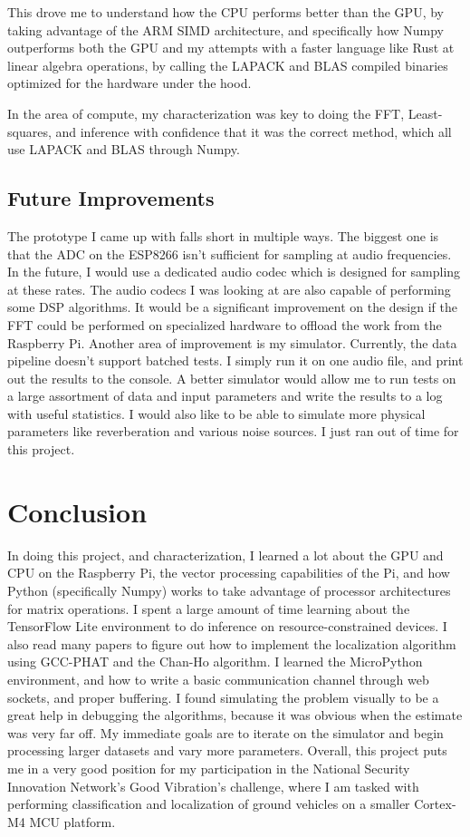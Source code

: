 \documentclass[12pt]{article}
\begin{document}
This drove me to understand how the CPU performs better than the GPU, by taking advantage of the ARM SIMD architecture, and specifically how Numpy outperforms both the GPU and my attempts with a faster language like Rust at linear algebra operations, by calling the LAPACK and BLAS compiled binaries optimized for the hardware under the hood.

In the area of compute, my characterization was key to doing the FFT, Least-squares, and inference with confidence that it was the correct method, which all use LAPACK and BLAS through Numpy.

\subsection{Future Improvements}
	The prototype I came up with falls short in multiple ways. The biggest one is that the ADC on the ESP8266 isn't sufficient for sampling at audio frequencies. In the future, I would use a dedicated audio codec which is designed for sampling at these rates. The audio codecs I was looking at are also capable of performing some DSP algorithms. It would be a significant improvement on the design if the FFT could be performed on specialized hardware to offload the work from the Raspberry Pi. 
	Another area of improvement is my simulator. Currently, the data pipeline doesn't support batched tests. I simply run it on one audio file, and print out the results to the console. A better simulator would allow me to run tests on a large assortment of data and input parameters and write the results to a log with useful statistics. I would also like to be able to simulate more physical parameters like reverberation and various noise sources. I just ran out of time for this project. 

\section{Conclusion}\label{sec:conclusion}

	In doing this project, and characterization, I learned a lot about the GPU and CPU on the Raspberry Pi, the vector processing capabilities of the Pi, and how Python (specifically Numpy) works to take advantage of processor architectures for matrix operations. I spent a large amount of time learning about the TensorFlow Lite environment to do inference on resource-constrained devices. I also read many papers to figure out how to implement the localization algorithm using GCC-PHAT and the Chan-Ho algorithm. I learned the MicroPython environment, and how to write a basic communication channel through web sockets, and proper buffering.
	I found simulating the problem visually to be a great help in debugging the algorithms, because it was obvious when the estimate was very far off. My immediate goals are to iterate on the simulator and begin processing larger datasets and vary more parameters. Overall, this project puts me in a very good position for my participation in the National Security Innovation Network's Good Vibration's challenge, where I am tasked with performing classification and localization of ground vehicles on a smaller Cortex-M4 MCU platform.
\end{document}
